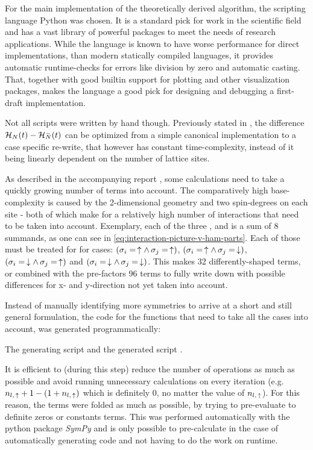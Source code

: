 For the main implementation of the theoretically derived algorithm, the scripting language Python was chosen.
It is a standard pick for work in the scientific field and has a vast library of powerful packages to meet the needs of research applications.
While the language is known to have worse performance for direct implementations, than modern statically compiled languages, it provides automatic runtime-checks for errors like division by zero and automatic casting.
That, together with good builtin support for plotting and other visualization packages, makes the language a good pick for designing and debugging a first-draft implementation.

Not all scripts were written by hand though.
Previously stated in , the difference $\HNOft - \HNOft[\vphantom{N}\smash{\tilde{N}}]$ can be optimized from a simple canonical implementation to a case specific re-write, that however has constant time-complexity, instead of it being linearly dependent on the number of lattice sites.

As described in the accompanying report , some calculations need to take a quickly growing number of terms into account.
The comparatively high base-complexity is caused by the 2-dimensional geometry and two spin-degrees on each site - both of which make for a relatively high number of interactions that need to be taken into account.
Exemplary, each of the three ,  and  is a sum of 8 summands, as one can see in \autoref{eq:interaction-picture-v-ham-parts}.
Each of those must be treated for for cases: $(\sigma_i = \,\uparrow \land \,\sigma_j = \,\uparrow)$, $(\sigma_i = \,\uparrow \land \,\sigma_j = \,\downarrow)$, $(\sigma_i = \,\downarrow \land \,\sigma_j = \,\uparrow)$ and $(\sigma_i = \,\downarrow \land \,\sigma_j = \,\downarrow)$.
This makes 32 differently-shaped terms, or combined with the pre-factors 96 terms to fully write down with possible differences for x- and y-direction not yet taken into account.

Instead of manually identifying more symmetries to arrive at a short and still general formulation, the code for the functions that need to take all the cases into account, was generated programmatically:

The generating script  and the generated script .

It is efficient to (during this step) reduce the number of operations as much as possible and avoid running unnecessary calculations on every iteration (e.g. $n_{l,\,\uparrow} + 1 - (1 + n_{l,\,\uparrow})$ which is definitely 0, no matter the value of $n_{l,\,\uparrow}$).
For this reason, the terms were folded as much as possible, by trying to pre-evaluate to definite zeros or constants terms.
This was performed automatically with the python package \emph{SymPy} \cite{sympyPackage} and is only possible to pre-calculate in the case of automatically generating code and not having to do the work on runtime.
